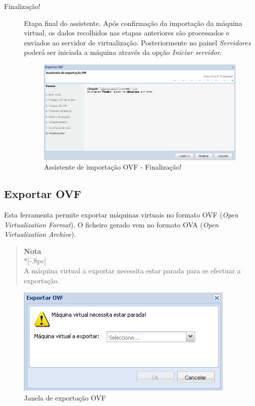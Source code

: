 \begin{description}
    \item[Finalização!] Etapa final do assistente. Após confirmação da importação da máquina virtual, os dados recolhidos nas etapas anteriores são processados e enviados ao servidor de virtualização. Posteriormente no painel \emph{Servidores} poderá ser iniciada a máquina através da opção \emph{Iniciar servidor}.
		\begin{figure}[H]
			\begin{center}
			\includegraphics[scale=0.5]{screenshots/ovf_import_finish.png}
            \caption{Assistente de importação OVF - Finalização!}
			\label{fig:ovf_import_finish}
			\end{center}
		\end{figure}

\end{description}

\subsection{Exportar OVF}
Esta ferramenta permite exportar máquinas virtuais no formato OVF (\emph{Open Virtualization Format}).
O ficheiro gerado vem no formato OVA (\emph{Open Virtualization Archive}).

\begin{quote}
	{\large \bf Nota} \\*[-.8pc]
	\underline{\hspace{6in}} \\
	A máquina virtual a exportar necessita estar parada para se efectuar a exportação.
\end{quote}

\begin{figure}[H]
	\begin{center}
	\includegraphics[scale=0.5]{screenshots/ovf_export.png}
	\caption{Janela de exportação OVF}
	\label{fig:ovf_export}
	\end{center}
\end{figure}


